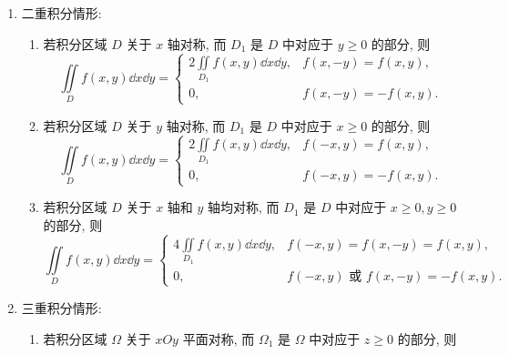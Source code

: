 \begin{theorem}[重积分的对称性]
    \begin{enumerate}[label=(\arabic{*})]
        \item 二重积分情形:
              \begin{enumerate}[label=(\roman{*})]
                  \item 若积分区域 $ D $ 关于 $ x $ 轴对称, 而 $ D_{1}$ 是 $ D $ 中对应于 $ y \geqslant 0 $ 的部分, 则
                        $$\iint\limits_{D} f(x, y) \dd  x \dd  y=\begin{cases}
                                2 \displaystyle\iint\limits_{D_{1}} f(x, y) \dd  x \dd  y, & f(x,-y)=f(x, y),   \\
                                0,                                                  & f(x,-y)=-f(x, y) .
                            \end{cases}$$
                  \item 若积分区域 $ D $ 关于 $ y $ 轴对称, 而 $ D_{1} $ 是 $ D $ 中对应于 $ x \geqslant 0 $ 的部分, 则
                        $$\iint\limits_{D} f(x, y) \dd  x \dd  y=\begin{cases}
                                2 \displaystyle\iint\limits_{D_{1}} f(x, y) \dd  x \dd  y, & f(-x, y)=f(x, y),   \\
                                0,                                                  & f(-x, y)=-f(x, y) .
                            \end{cases}$$
                  \item 若积分区域 $ D $ 关于 $ x $ 轴和 $ y $ 轴均对称, 而 $ D_{1} $ 是 $ D $ 中对应于 $ x \geqslant 0, y \geqslant 0 $ 的部分, 则
                        $$\iint\limits_{D} f(x, y) \dd  x \dd  y=\begin{cases}
                                4 \displaystyle\iint\limits_{D_{1}} f(x, y) \dd  x \dd  y, & f(-x, y)=f(x,-y)=f(x, y),                \\
                                0,                                                  & f(-x, y) \text { 或 } f(x,-y)=-f(x, y) .
                            \end{cases}$$
              \end{enumerate}
        \item 三重积分情形:
              \begin{enumerate}[label=(\roman{*})]
                  \item 若积分区域 $ \Omega $ 关于 $ x O y $ 平面对称, 而 $ \Omega_{1} $ 是 $ \Omega $ 中对应于 $ z \geqslant 0 $ 的部分, 则

\end{enumerate}
\end{enumerate}
\end{theorem}
